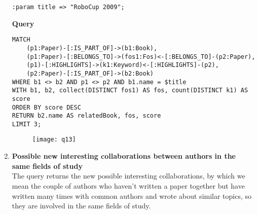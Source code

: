 \begin{enumerate}
    \begin{lstlisting}[label={lst:lstlisting45}]
:param title => "RoboCup 2009";
    \end{lstlisting}
    \textbf{Query}
    \begin{lstlisting}[label={lst:lstlisting46}]
MATCH
    (p1:Paper)-[:IS_PART_OF]->(b1:Book),
    (p1:Paper)-[:BELONGS_TO]->(fos1:Fos)<-[:BELONGS_TO]-(p2:Paper),
    (p1)-[:HIGHLIGHTS]->(k1:Keyword)<-[:HIGHLIGHTS]-(p2),
    (p2:Paper)-[:IS_PART_OF]->(b2:Book)
WHERE b1 <> b2 AND p1 <> p2 AND b1.name = $title
WITH b1, b2, collect(DISTINCT fos1) AS fos, count(DISTINCT k1) AS score
ORDER BY score DESC
RETURN b2.name AS relatedBook, fos, score
LIMIT 3;
    \end{lstlisting}
    \begin{figure}[H]
        \begin{center}
            \texttt{[image: q13]}
            \label{fig:q13}%
        \end{center}
    \end{figure}
    \item \textbf{Possible new interesting collaborations between authors in the same fields of study}\\
    The query returns the new possible interesting collaborations, by which we mean the couple of authors who haven't written a paper together but have written many times with common authors and wrote about similar topics, so they are involved in the same fields of study.


\end{enumerate}
